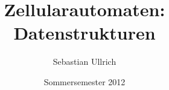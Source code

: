 \documentclass{beamer}
\title{Zellularautomaten: Datenstrukturen}
\author{Sebastian Ullrich}
\date{Sommersemester 2012}
\begin{document}
\newcommand{\ve}[3]{\begin{pmatrix}#1\\#2\\#3\end{pmatrix}}

\newcommand{\pop}{\ensuremath{\mathit{pop}}}
\newcommand{\popZiel}{\ensuremath{\mathit{popZiel}}}
\newcommand{\popQuelle}{\ensuremath{\mathit{popQuelle}}}
\newcommand{\nop}{\ensuremath{\mathit{nop}}}
\newcommand{\push}{\ensuremath{\mathit{push}}}
\newcommand{\pushZiel}{\ensuremath{\mathit{pushZiel}}}
\newcommand{\pushQuelle}{\ensuremath{\mathit{pushQuelle}}}

\begin{frame}
    \titlepage
\end{frame}

\begin{frame}
    \tableofcontents
\end{frame}
\end{document}

